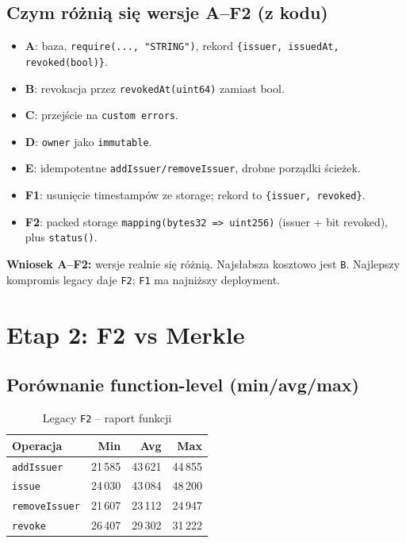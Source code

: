 \documentclass[11pt,a4paper]{article}
\begin{document}
\subsection{Czym różnią się wersje A--F2 (z kodu)}
\begin{itemize}
  \item \textbf{A}: baza, \texttt{require(..., "STRING")}, rekord \texttt{\{issuer, issuedAt, revoked(bool)\}}.
  \item \textbf{B}: revokacja przez \texttt{revokedAt(uint64)} zamiast bool.
  \item \textbf{C}: przejście na \texttt{custom errors}.
  \item \textbf{D}: \texttt{owner} jako \texttt{immutable}.
  \item \textbf{E}: idempotentne \texttt{addIssuer/removeIssuer}, drobne porządki ścieżek.
  \item \textbf{F1}: usunięcie timestampów ze storage; rekord to \texttt{\{issuer, revoked\}}.
  \item \textbf{F2}: packed storage \texttt{mapping(bytes32 => uint256)} (issuer + bit revoked), plus \texttt{status()}.
\end{itemize}

\noindent
\textbf{Wniosek A--F2:} wersje realnie się różnią. Najsłabsza kosztowo jest \texttt{B}. Najlepszy kompromis legacy daje \texttt{F2}; \texttt{F1} ma najniższy deployment.

\section{Etap 2: F2 vs Merkle}
\subsection{Porównanie function-level (min/avg/max)}
\begin{table}[h]
\centering
\caption{Legacy \texttt{F2} -- raport funkcji}
\begin{tabular}{lrrr}
\toprule
Operacja & Min & Avg & Max \\
\midrule
\texttt{addIssuer} & 21\,585 & 43\,621 & 44\,855 \\
\texttt{issue} & 24\,030 & 43\,084 & 48\,200 \\
\texttt{removeIssuer} & 21\,607 & 23\,112 & 24\,947 \\
\texttt{revoke} & 26\,407 & 29\,302 & 31\,222 \\
\bottomrule
\end{tabular}
\end{table}
\end{document}
